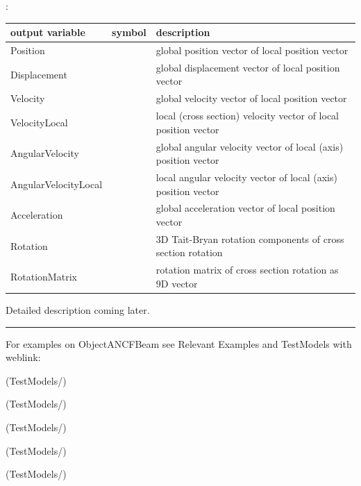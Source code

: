 :
\begin{center}
\footnotesize
\begin{longtable}{| p{5cm} | p{5cm} | p{6cm} |} 
\hline
\bf output variable & \bf symbol & \bf description \\ \hline
Position &  & global position vector of local position vector\\ \hline
Displacement &  & global displacement vector of local position vector\\ \hline
Velocity &  & global velocity vector of local position vector\\ \hline
VelocityLocal &  & local (cross section) velocity vector of local position vector\\ \hline
AngularVelocity &  & global angular velocity vector of local (axis) position vector\\ \hline
AngularVelocityLocal &  & local angular velocity vector of local (axis) position vector\\ \hline
Acceleration &  & global acceleration vector of local position vector\\ \hline
Rotation &  & 3D Tait-Bryan rotation components of cross section rotation\\ \hline
RotationMatrix &  & rotation matrix of cross section rotation as 9D vector\\ \hline
\end{longtable}
\end{center}
 \noindent
    Detailed description coming later.
\vspace{6pt}\par\noindent\rule{\textwidth}{0.4pt}
%
\noindent For examples on ObjectANCFBeam see Relevant Examples and TestModels with weblink:
\bi
\item {} (TestModels/)
\item {} (TestModels/)
\item {} (TestModels/)
\item {} (TestModels/)
\item {} (TestModels/)


